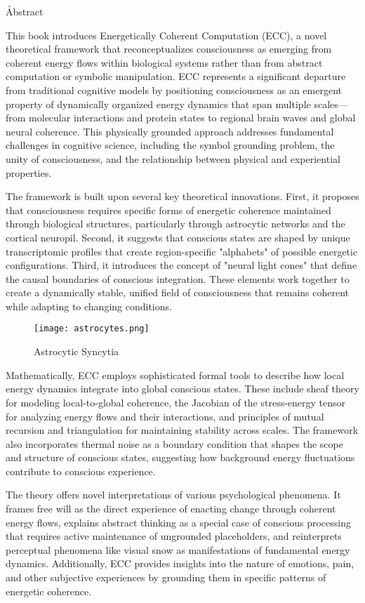 \h{Abstract}

This book introduces Energetically Coherent Computation (ECC), a novel theoretical framework that reconceptualizes consciousness as emerging from coherent energy flows within biological systems rather than from abstract computation or symbolic manipulation. ECC represents a significant departure from traditional cognitive models by positioning consciousness as an emergent property of dynamically organized energy dynamics that span multiple scales—from molecular interactions and protein states to regional brain waves and global neural coherence. This physically grounded approach addresses fundamental challenges in cognitive science, including the symbol grounding problem, the unity of consciousness, and the relationship between physical and experiential properties.

The framework is built upon several key theoretical innovations. First, it proposes that consciousness requires specific forms of energetic coherence maintained through biological structures, particularly through astrocytic networks and the cortical neuropil. Second, it suggests that conscious states are shaped by unique transcriptomic profiles that create region-specific "alphabets" of possible energetic configurations. Third, it introduces the concept of "neural light cones" that define the causal boundaries of conscious integration. These elements work together to create a dynamically stable, unified field of consciousness that remains coherent while adapting to changing conditions.

\begin{figure}[h]
    \centering
    \texttt{[image: astrocytes.png]}

    \caption{Astrocytic Syncytia}
\end{figure}

Mathematically, ECC employs sophisticated formal tools to describe how local energy dynamics integrate into global conscious states. These include sheaf theory for modeling local-to-global coherence, the Jacobian of the stress-energy tensor for analyzing energy flows and their interactions, and principles of mutual recursion and triangulation for maintaining stability across scales. The framework also incorporates thermal noise as a boundary condition that shapes the scope and structure of conscious states, suggesting how background energy fluctuations contribute to conscious experience.

The theory offers novel interpretations of various psychological phenomena. It frames free will as the direct experience of enacting change through coherent energy flows, explains abstract thinking as a special case of conscious processing that requires active maintenance of ungrounded placeholders, and reinterprets perceptual phenomena like visual snow as manifestations of fundamental energy dynamics. Additionally, ECC provides insights into the nature of emotions, pain, and other subjective experiences by grounding them in specific patterns of energetic coherence.

